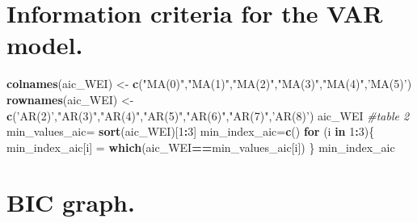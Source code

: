 \documentclass[]{article}
\newenvironment{Shaded}{\begin{snugshade}}{\end{snugshade}}
\newcommand{\KeywordTok}[1]{\textcolor[rgb]{0.13,0.29,0.53}{\textbf{#1}}}
\newcommand{\DecValTok}[1]{\textcolor[rgb]{0.00,0.00,0.81}{#1}}
\newcommand{\StringTok}[1]{\textcolor[rgb]{0.31,0.60,0.02}{#1}}
\newcommand{\CommentTok}[1]{\textcolor[rgb]{0.56,0.35,0.01}{\textit{#1}}}
\newcommand{\ControlFlowTok}[1]{\textcolor[rgb]{0.13,0.29,0.53}{\textbf{#1}}}
\newcommand{\OperatorTok}[1]{\textcolor[rgb]{0.81,0.36,0.00}{\textbf{#1}}}
\newcommand{\NormalTok}[1]{#1}
\begin{document}
\section{Information criteria for the VAR
model.}\label{information-criteria-for-the-var-model.}

\begin{Shaded}
\begin{Highlighting}[]
\KeywordTok{colnames}\NormalTok{(aic_WEI) <-}\StringTok{ }\KeywordTok{c}\NormalTok{(}\StringTok{"MA(0)"}\NormalTok{,}\StringTok{"MA(1)"}\NormalTok{,}\StringTok{"MA(2)"}\NormalTok{,}\StringTok{"MA(3)"}\NormalTok{,}\StringTok{"MA(4)"}\NormalTok{,}\StringTok{'MA(5)'}\NormalTok{)}
\KeywordTok{rownames}\NormalTok{(aic_WEI) <-}\StringTok{ }\KeywordTok{c}\NormalTok{(}\StringTok{'AR(2)'}\NormalTok{,}\StringTok{"AR(3)"}\NormalTok{,}\StringTok{"AR(4)"}\NormalTok{,}\StringTok{"AR(5)"}\NormalTok{,}\StringTok{"AR(6)"}\NormalTok{,}\StringTok{"AR(7)"}\NormalTok{,}\StringTok{'AR(8)'}\NormalTok{)}
\NormalTok{aic_WEI }\CommentTok{#table 2}
\NormalTok{min_values_aic=}\StringTok{ }\KeywordTok{sort}\NormalTok{(aic_WEI)[}\DecValTok{1}\OperatorTok{:}\DecValTok{3}\NormalTok{]}
\NormalTok{min_index_aic=}\KeywordTok{c}\NormalTok{() }
\ControlFlowTok{for}\NormalTok{ (i }\ControlFlowTok{in} \DecValTok{1}\OperatorTok{:}\DecValTok{3}\NormalTok{)\{}
\NormalTok{  min_index_aic[i] =}\StringTok{ }\KeywordTok{which}\NormalTok{(aic_WEI}\OperatorTok{==}\NormalTok{min_values_aic[i])}
\NormalTok{\}}
\NormalTok{min_index_aic}
\end{Highlighting}
\end{Shaded}

\section{BIC graph.}\label{bic-graph.}
\end{document}
